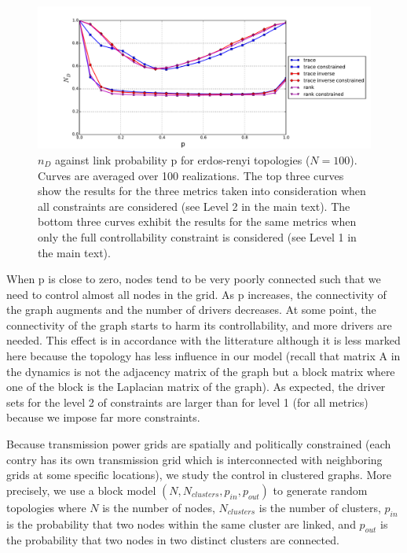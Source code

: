 \documentclass[conference]{IEEEtran}
\begin{document}
\begin{figure}
\label{fig:erdos_renyi}
\includegraphics[scale=.3]{graphique_1}
\caption{ $ n_D $ against link probability p for erdos-renyi topologies ($ N=100 $). Curves are averaged over 100 realizations. The top three curves show the results for the three metrics taken into consideration when all constraints are considered (see Level 2 in the main text). The bottom three curves exhibit the results for the same metrics when only the full controllability constraint is considered (see Level 1 in the main text).}
\end{figure}


When p is close to zero, nodes tend to be very poorly connected such that we need to control almost all nodes in the grid. As p increases, the connectivity of the graph augments and the number of drivers decreases. At some point, the connectivity of the graph starts to harm its controllability, and more drivers are needed. This effect is in accordance with the litterature although it is less marked here because the topology has less influence in our model (recall that matrix A in the dynamics is not the adjacency matrix of the graph but a block matrix where one of the block is the Laplacian matrix of the graph). As expected, the driver sets for the level 2 of constraints are larger than for level 1 (for all metrics) because we impose far more constraints.



Because transmission power grids are spatially and politically constrained (each contry has its own transmission grid which is interconnected with neighboring grids at some specific locations), we study the control in clustered graphs. More precisely, we use a block model $(N, N_{clusters}, p_{in}, p_{out} ) $ to generate random topologies where $ N $ is the number of nodes, $N_{clusters} $ is the number of clusters, $p_{in} $ is the probability that two nodes within the same cluster are linked, and $ p_{out} $ is the probability that two nodes in two distinct clusters are connected.
\end{document}
